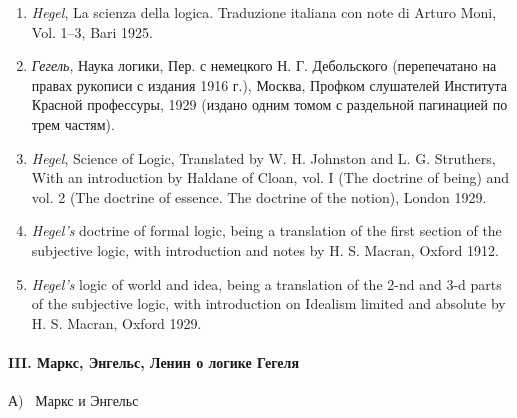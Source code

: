 \documentclass[twoside]{article}
\begin{document}
\begin{enumerate}
\item 
{\em Hegel}, La scienza della logica. Traduzione italiana con note di 
Arturo Moni, Vol. 1–3, Bari 1925.

\item 
{\em Гегель}, Наука логики, Пер. с немецкого Н. Г. Дебольского
(перепечатано на правах рукописи с издания 1916 г.), Москва, Профком
слушателей Института Красной профессуры, 1929 (издано одним томом с
раздельной пагинацией по трем частям).

\item 
{\em Hegel}, Science of Logic, Translated by W. H. Johnston and 
L. G. Struthers, With an introduction by Haldane of Cloan, vol. I 
(The doctrine of being) and vol. 2 (The doctrine of essence. The doctrine of
 the notion), London 1929.

\item 
{\em Hegel's} doctrine of formal logic, being a translation of the first 
section of the subjective logic, with introduction and notes by 
H. S. Macran, Oxford 1912.

\item 
{\em Hegel's} logic of world and idea, being a translation of the 2-nd and 
3-d parts of the subjective logic, with introduction on Idealism limited and 
absolute by H. S. Macran, Oxford 1929.
\end{enumerate}

\paragraph[III. Маркс, Энгельс, Ленин о логике Гегеля]
{III. Маркс, Энгельс, Ленин о логике Гегеля }

{\centering А) \ Маркс и Энгельс \par}
\end{document}
